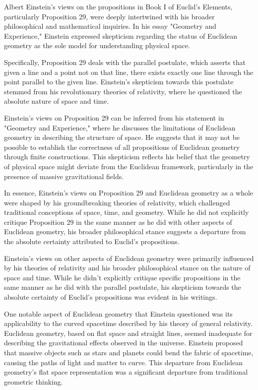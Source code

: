 
Albert Einstein's views on the propositions in Book I of Euclid's Elements, particularly Proposition 29, were deeply intertwined with his broader philosophical and mathematical inquiries. In his essay "Geometry and Experience," Einstein expressed skepticism regarding the status of Euclidean geometry as the sole model for understanding physical space.

Specifically, Proposition 29 deals with the parallel postulate, which asserts that given a line and a point not on that line, there exists exactly one line through the point parallel to the given line. Einstein's skepticism towards this postulate stemmed from his revolutionary theories of relativity, where he questioned the absolute nature of space and time.

Einstein's views on Proposition 29 can be inferred from his statement in "Geometry and Experience," where he discusses the limitations of Euclidean geometry in describing the structure of space. He suggests that it may not be possible to establish the correctness of all propositions of Euclidean geometry through finite constructions. This skepticism reflects his belief that the geometry of physical space might deviate from the Euclidean framework, particularly in the presence of massive gravitational fields.

In essence, Einstein's views on Proposition 29 and Euclidean geometry as a whole were shaped by his groundbreaking theories of relativity, which challenged traditional conceptions of space, time, and geometry. While he did not explicitly critique Proposition 29 in the same manner as he did with other aspects of Euclidean geometry, his broader philosophical stance suggests a departure from the absolute certainty attributed to Euclid's propositions.





Einstein's views on other aspects of Euclidean geometry were primarily influenced by his theories of relativity and his broader philosophical stance on the nature of space and time. While he didn't explicitly critique specific propositions in the same manner as he did with the parallel postulate, his skepticism towards the absolute certainty of Euclid's propositions was evident in his writings.

One notable aspect of Euclidean geometry that Einstein questioned was its applicability to the curved spacetime described by his theory of general relativity. Euclidean geometry, based on flat space and straight lines, seemed inadequate for describing the gravitational effects observed in the universe. Einstein proposed that massive objects such as stars and planets could bend the fabric of spacetime, causing the paths of light and matter to curve. This departure from Euclidean geometry's flat space representation was a significant departure from traditional geometric thinking.

